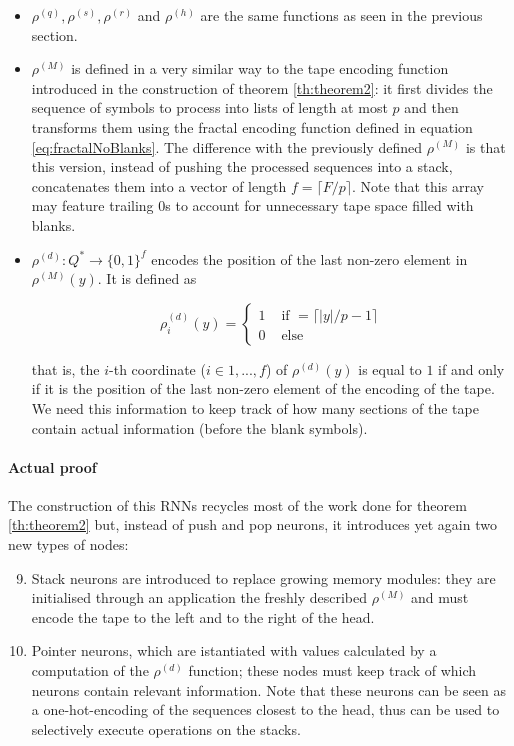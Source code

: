 \documentclass{article}
\begin{document}
\begin{itemize}
    \item $\rho^{(q)}, \rho^{(s)}, \rho^{(r)}$ and $\rho^{(h)}$ are the same functions as seen in the previous section.

    \item $\rho^{(M)}$ is defined in a very similar way to the tape encoding function introduced in the construction of theorem \ref{th:theorem2}: it first divides the sequence of symbols to process into lists of length at most $p$ and then transforms them using the fractal encoding function defined in equation \ref{eq:fractalNoBlanks}. The difference with the previously defined $\rho^{(M)}$ is that this version, instead of pushing the processed sequences into a stack, concatenates them into a vector of length $f=\lceil F/p \rceil$. Note that this array may feature trailing $0$s to account for unnecessary tape space filled with blanks.
    
    \item $\rho^{(d)}: Q^* \to \{0,1\}^f$ encodes the position of the last non-zero element in $\rho^{(M)}(y)$. It is defined as

    \begin{equation}
        \rho^{(d)}_i(y)=
        \begin{cases}
            1 & \textrm{ if } = \lceil |y|/p-1 \rceil\\
            0 & \textrm{ else }
        \end{cases}
    \end{equation}

    that is, the $i$-th coordinate ($i \in {1,...,f}$) of $\rho^{(d)}(y)$ is equal to $1$ if and only if it is the position of the last non-zero element of the encoding of the tape. We need this information to keep track of how many sections of the tape contain actual information (before the blank symbols).
\end{itemize}

\paragraph{Actual proof}
The construction of this RNNs recycles most of the work done for theorem \ref{th:theorem2} but, instead of push and pop neurons, it introduces yet again two new types of nodes:

\begin{enumerate}
    \setcounter{enumi}{8}
    \item Stack neurons are introduced to replace growing memory modules: they are initialised through an application the freshly described $\rho^{(M)}$ and must encode the tape to the left and to the right of the head.
    \item Pointer neurons, which are istantiated with values calculated by a computation of the $\rho^{(d)}$ function; these nodes must keep track of which neurons contain relevant information. Note that these neurons can be seen as a one-hot-encoding of the sequences closest to the head, thus can be used to selectively execute operations on the stacks.
\end{enumerate}
\end{document}
